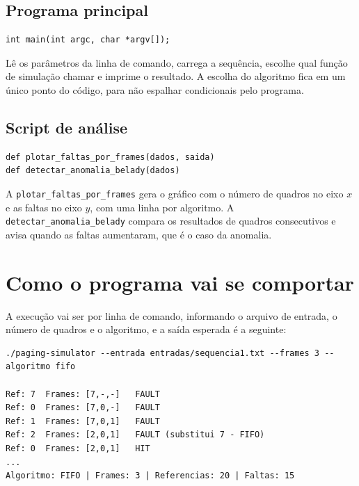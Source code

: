 \documentclass[12pt]{article}
\begin{document}
\subsection{Programa principal}
\label{sec:main}

{\scriptsize
\begin{verbatim}
int main(int argc, char *argv[]);
\end{verbatim}
}

Lê os parâmetros da linha de comando, carrega a sequência, escolhe qual função de
simulação chamar e imprime o resultado. A escolha do algoritmo fica em um único
ponto do código, para não espalhar condicionais pelo programa.

\subsection{Script de análise}
\label{sec:analise}

{\scriptsize
\begin{verbatim}
def plotar_faltas_por_frames(dados, saida)
def detectar_anomalia_belady(dados)
\end{verbatim}
}

A \texttt{plotar\_faltas\_por\_frames} gera o gráfico com o número de quadros no
eixo $x$ e as faltas no eixo $y$, com uma linha por algoritmo. A
\texttt{detectar\_anomalia\_belady} compara os resultados de quadros
consecutivos e avisa quando as faltas aumentaram, que é o caso da anomalia.

\section{Como o programa vai se comportar}
\label{sec:comportamento}

A execução vai ser por linha de comando, informando o arquivo de entrada, o
número de quadros e o algoritmo, e a saída esperada é a seguinte:

{\scriptsize
\begin{verbatim}
./paging-simulator --entrada entradas/sequencia1.txt --frames 3 --algoritmo fifo

Ref: 7  Frames: [7,-,-]   FAULT
Ref: 0  Frames: [7,0,-]   FAULT
Ref: 1  Frames: [7,0,1]   FAULT
Ref: 2  Frames: [2,0,1]   FAULT (substitui 7 - FIFO)
Ref: 0  Frames: [2,0,1]   HIT
...
Algoritmo: FIFO | Frames: 3 | Referencias: 20 | Faltas: 15
\end{verbatim}
}
\end{document}
